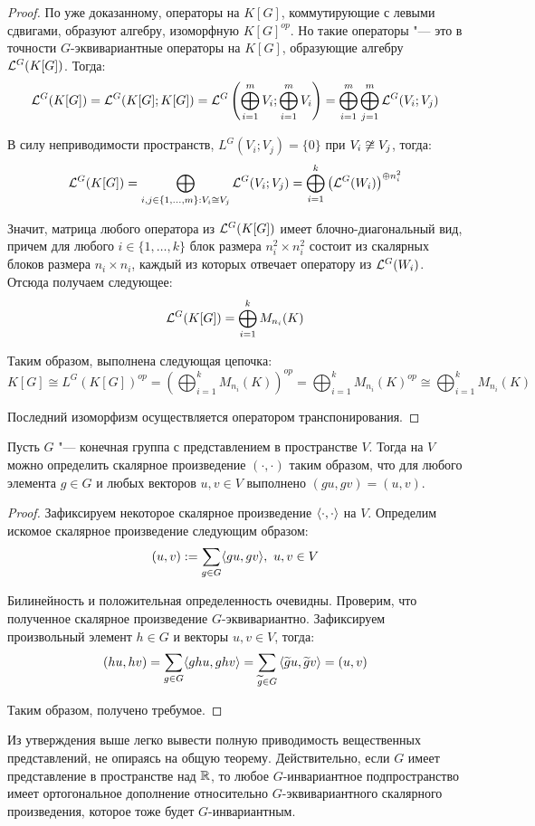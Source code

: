 \begin{proof}
	По уже доказанному, операторы на $K[G]$, коммутирующие с левыми сдвигами, образуют алгебру, изоморфную $K[G]^{op}$. Но такие операторы "--- это в точности $G$-эквивариантные операторы на $K[G]$, образующие алгебру $\mathcal L^G(K[G])$. Тогда:
	\[\mathcal L^G(K[G]) = \mathcal L^G(K[G]; K[G]) = \mathcal L^G\left(\bigoplus_{i=1}^mV_i; \bigoplus_{i=1}^mV_i\right) = \bigoplus_{i = 1}^m\bigoplus_{j=1}^m \mathcal L^G(V_i; V_j)\]
	
	В силу неприводимости пространств, $L^G(V_i; V_j) = \{0\}$ при $V_i \centernot\cong V_j$, тогда:
	\[\mathcal L^G(K[G]) = \bigoplus_{i, j \in \{1, \dotsc, m\}: V_i \cong V_j}\mathcal L^G(V_i; V_j) = \bigoplus_{i = 1}^k\left(\mathcal L^G(W_i)\right)^{\oplus n_i^2}\]
	
	Значит, матрица любого оператора из $\mathcal L^G(K[G])$ имеет блочно-диагональный вид, причем	для любого $i \in \{1, \dotsc, k\}$ блок размера $n_i^2 \times n_i^2$ состоит из скалярных блоков размера $n_i \times n_i$, каждый из которых отвечает оператору из $\mathcal L^G(W_i)$. Отсюда получаем следующее:
	\[\mathcal L^G(K[G]) = \bigoplus_{i = 1}^kM_{n_i}(K)\]
	
	Таким образом, выполнена следующая цепочка:
	\[K[G] \cong L^G(K[G])^{op} = \left(\bigoplus_{i = 1}^kM_{n_i}(K)\right)^{op} = \bigoplus_{i=1}^kM_{n_i}(K)^{op} \cong \bigoplus_{i=1}^kM_{n_i}(K)\]
	
	Последний изоморфизм осуществляется оператором транспонирования.
\end{proof}

\begin{proposition}
	Пусть $G$ "--- конечная группа с представлением в пространстве $V$. Тогда на $V$ можно определить скалярное произведение $(\cdot, \cdot)$ таким образом, что для любого элемента $g \in G$ и любых векторов $u, v \in V$ выполнено $(gu, gv) = (u, v)$.
\end{proposition}

\begin{proof}
	Зафиксируем некоторое скалярное произведение $\langle \cdot, \cdot \rangle$ на $V$. Определим искомое скалярное произведение следующим образом:
	\[(u, v) := \sum_{g \in G}\langle gu, gv \rangle,~u, v \in V\]
	
	Билинейность и положительная определенность очевидны. Проверим, что полученное скалярное произведение $G$-эквивариантно. Зафиксируем произвольный элемент $h \in G$ и векторы $u, v \in V$, тогда:
	\[(hu, hv) = \sum_{g \in G}\langle ghu, ghv \rangle =  \sum_{\widetilde g \in G}\left\langle \widetilde gu, \widetilde gv \right\rangle = (u, v)\]
	
	Таким образом, получено требумое.
\end{proof}

\begin{note}
	Из утверждения выше легко вывести полную приводимость вещественных представлений, не опираясь на общую теорему. Действительно, если $G$ имеет представление в пространстве над $\mathbb{R}$, то любое $G$-инвариантное подпространство имеет ортогональное дополнение относительно $G$-эквивариантного скалярного произведения, которое тоже будет $G$-инвариантным.
\end{note}